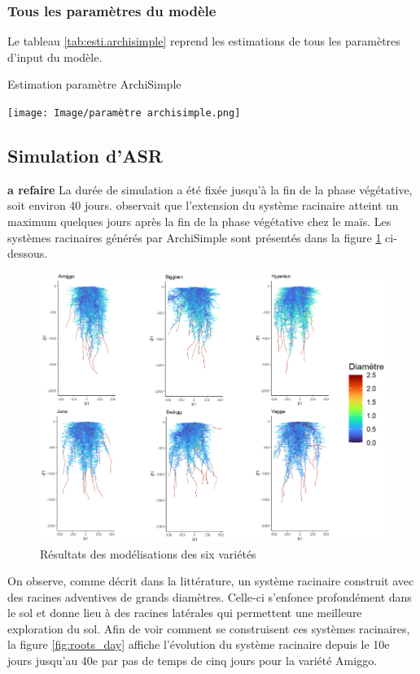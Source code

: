 \subsubsection{Tous les paramètres du modèle}

Le tableau \ref{tab:esti.archisimple} reprend les estimations de tous les paramètres d'input du modèle.

\begin{table}[ht]
    \centering
    \caption{Estimation paramètre ArchiSimple}
    \texttt{[image: Image/paramètre archisimple.png]}
    \label{tab:esti.archisimple}
\end{table}

\subsection{Simulation d'ASR}
\textbf{a refaire}
La durée de simulation a été fixée jusqu'à la fin de la phase végétative, soit environ 40 jours.
\cite{pellerinand_evaluation_1994} observait que l'extension du système racinaire atteint un maximum quelques jours après la fin de la phase végétative chez le maïs.
Les systèmes racinaires générés par ArchiSimple sont présentés dans la figure \ref{fig:roots} ci-dessous.
\newpage

\begin{figure}[ht]
\centering
\includegraphics[width=1\textwidth]{Image/roots.png}
\caption{Résultats des modélisations des six variétés}
\label{fig:roots}
\end{figure}

On observe, comme décrit dans la littérature, un système racinaire construit avec des racines adventives de grands diamètres.
Celle-ci s'enfonce profondément dans le sol et donne lieu à des racines latérales qui permettent une meilleure exploration du sol.
Afin de voir comment se construisent ces systèmes racinaires, la figure \ref{fig:roots_day} affiche l'évolution du système racinaire depuis le 10e jours jusqu'au 40e par pas de temps de cinq jours pour la variété Amiggo.
\newpage

